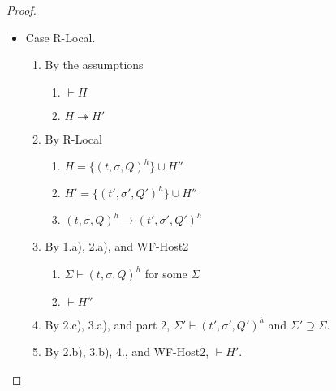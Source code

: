 \documentclass{article}
\theoremstyle{definition}
\begin{document}
\begin{proof}
\begin{itemize}
\item Case R-Local.
\begin{enumerate}
\item By the assumptions
  \begin{enumerate}[label=(\alph*)]
  \item $\vdash H$
  \item $H \twoheadrightarrow H'$
  \end{enumerate}
\item By R-Local
  \begin{enumerate}[label=(\alph*)]
  \item $H = \{ (t, \sigma, Q)^h \} \cup H''$
  \item $H' = \{ (t', \sigma', Q')^h \} \cup H''$
  \item $(t, \sigma, Q)^h \longrightarrow (t', \sigma', Q')^h$
  \end{enumerate}
\item By 1.a), 2.a), and WF-Host2
  \begin{enumerate}[label=(\alph*)]
  \item $\Sigma \vdash (t, \sigma, Q)^h$ for some $\Sigma$
  \item $\vdash H''$
  \end{enumerate}
\item By 2.c), 3.a), and part 2, $\Sigma' \vdash (t', \sigma', Q')^h$ and $\Sigma' \supseteq \Sigma$.
\item By 2.b), 3.b), 4., and WF-Host2, $\vdash H'$.
\end{enumerate}


\end{itemize}
\end{proof}
\end{document}
